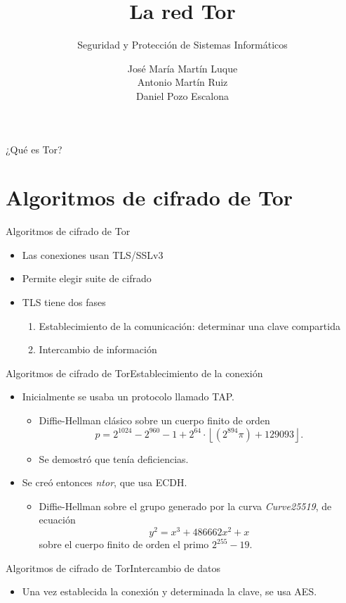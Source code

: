 \documentclass[spanish]{beamer}
\title{La red Tor}
\subtitle{Seguridad y Protección de Sistemas Informáticos}
\author{
  José María Martín Luque \texorpdfstring{\\}{} 
  Antonio Martín Ruiz \texorpdfstring{\\}{} 
  Daniel Pozo Escalona
}
\begin{document}
\maketitle

\begin{frame}{¿Qué es Tor?}
  
\end{frame}

\section{Algoritmos de cifrado de Tor}

\begin{frame}{Algoritmos de cifrado de Tor}{}

  \begin{itemize}
    \item Las conexiones usan TLS/SSLv3

    \item Permite elegir suite de cifrado
  
    \item TLS tiene dos fases \begin{enumerate}
      \item Establecimiento de la comunicación: determinar una clave compartida
      \item Intercambio de información
    \end{enumerate}
  \end{itemize}
  
\end{frame}

\begin{frame}{Algoritmos de cifrado de Tor}{Establecimiento de la conexión}

  \begin{itemize}
    \item Inicialmente se usaba un protocolo llamado TAP. \begin{itemize}
      \item Diffie-Hellman clásico sobre un cuerpo finito de orden \[
        p = 2^{1024} - 2^{960} - 1 + 2^{64} \cdot \left\lfloor (2^{894} \pi) + 129093 \right\rfloor.
      \]
      \item Se demostró que tenía deficiencias.
    \end{itemize}
    \item Se creó entonces \textit{ntor}, que usa ECDH. \begin{itemize}
      \item Diffie-Hellman sobre el grupo generado por la curva \textit{Curve25519}, de ecuación \[y^{2}=x^{3}+486662x^{2}+x\] sobre el cuerpo finito de orden el primo \(2^{255}-19\).
    \end{itemize}
  \end{itemize}
  
\end{frame}

\begin{frame}{Algoritmos de cifrado de Tor}{Intercambio de datos}

  \begin{itemize}
    \item Una vez establecida la conexión y determinada la clave, se usa AES.
  \end{itemize}
  
\end{frame}
\end{document}

